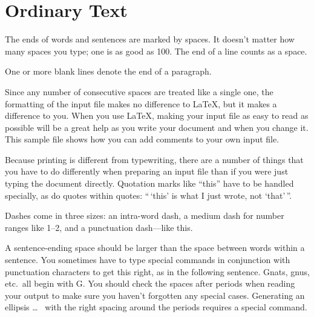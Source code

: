 \chapter{Ordinary Text} 	%
	


The ends  of words and sentences are marked 
by   spaces. It  doesn't matter how many 
spaces    you type; one is as good as 100.  The
end of   a line counts as a space.

One   or more   blank lines denote the  end 
of  a paragraph.  

Since any number of consecutive spaces are treated
like a single one, the formatting of the input
file makes no difference to
\LaTeX,                %
but it makes a difference to you.  When you use 
\LaTeX \cite{lamport94},  %
making your input file as easy to read
as possible will be a great help as you write 
your document and when you change it.  This sample 
file shows how you can add comments to your own input 
file.

Because printing is different from typewriting,
there are a number of things that you have to do
differently when preparing an input file than if
you were just typing the document directly.
Quotation marks like
``this'' 
have to be handled specially, as do quotes within
quotes:
``\,`this'            %
is what I just 
wrote, not  `that'\,''.  

Dashes come in three sizes: an 
intra-word 
dash, a medium dash for number ranges like 
1--2, 
and a punctuation 
dash---like 
this.

A sentence-ending space should be larger than the
space between words within a sentence.  You
sometimes have to type special commands in
conjunction with punctuation characters to get
this right, as in the following sentence.
Gnats, gnus, etc.\ all  %
begin with G\@.         %
You should check the spaces after periods when
reading your output to make sure you haven't
forgotten any special cases.  Generating an
ellipsis
\ldots\               %
%
%
with the right spacing around the periods requires
a special command.


